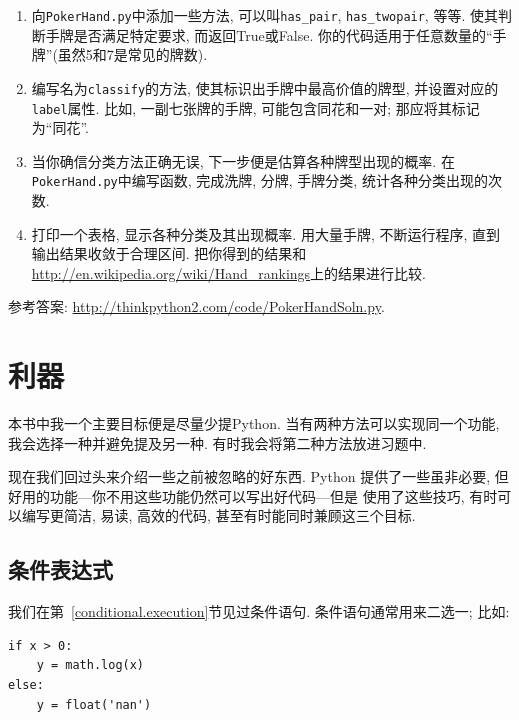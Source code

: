 \documentclass[10pt]{book}
\begin{document}
\begin{exercise}
\begin{enumerate}
\item 向{\tt PokerHand.py}中添加一些方法, 可以叫\verb"has_pair",
\verb"has_twopair", 等等. 使其判断手牌是否满足特定要求, 而返回True或False. 
你的代码适用于任意数量的``手牌''(虽然5和7是常见的牌数). 

\item 编写名为{\tt classify}的方法, 使其标识出手牌中最高价值的牌型, 
并设置对应的{\tt label}属性. 比如, 一副七张牌的手牌, 
可能包含同花和一对;
那应将其标记为``同花''.

\item 当你确信分类方法正确无误, 下一步便是估算各种牌型出现的概率. 
在{\tt PokerHand.py}中编写函数, 完成洗牌, 分牌, 手牌分类, 
统计各种分类出现的次数. 

\item 打印一个表格, 显示各种分类及其出现概率. 
用大量手牌, 不断运行程序, 直到输出结果收敛于合理区间. 
把你得到的结果和\url{http://en.wikipedia.org/wiki/Hand_rankings}上的结果进行比较. 

\end{enumerate}

参考答案: \url{http://thinkpython2.com/code/PokerHandSoln.py}.
\end{exercise}


\chapter{利器}

本书中我一个主要目标便是尽量少提Python. 
当有两种方法可以实现同一个功能, 我会选择一种并避免提及另一种. 
有时我会将第二种方法放进习题中. 

现在我们回过头来介绍一些之前被忽略的好东西. 
Python 提供了一些虽非必要, 但好用的功能---你不用这些功能仍然可以写出好代码---但是
使用了这些技巧, 有时可以编写更简洁, 易读, 高效的代码, 甚至有时能同时兼顾这三个目标. 


\section{条件表达式}

我们在第~\ref{conditional.execution}节见过条件语句. 
条件语句通常用来二选一; 比如:

\begin{verbatim}
if x > 0:
    y = math.log(x)
else:
    y = float('nan')
\end{verbatim}
\end{document}
